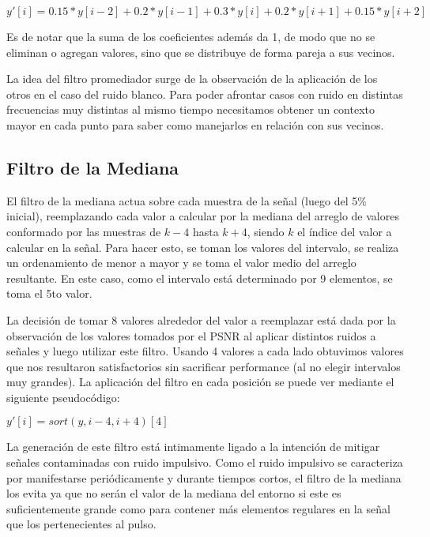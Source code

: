 \begin{center}
$y'[i]=0.15*y[i-2] + 0.2*y[i-1] + 0.3*y[i]+0.2*y[i+1]+0.15*y[i+2]$\\
\end{center}

Es de notar que la suma de los coeficientes adem\'as da 1, de modo que no se 
eliminan o agregan valores, sino que se distribuye de forma pareja a sus vecinos.

La idea del filtro promediador surge de la observaci\'on de la aplicaci\'on de
los otros en el caso del ruido blanco. Para poder afrontar casos con ruido en
distintas frecuencias muy distintas al mismo tiempo necesitamos obtener un
contexto mayor en cada punto para saber como manejarlos en relaci\'on con sus
vecinos.

\subsection{Filtro de la Mediana}

El filtro de la mediana actua sobre cada muestra de la se\~nal (luego del 5\% inicial),
reemplazando cada valor a calcular por la mediana del arreglo de valores conformado por
las muestras de $k - 4$ hasta $k + 4$, siendo $k$ el \'indice del valor a calcular en la 
se\~nal. Para hacer esto, se toman los valores del intervalo, se realiza un ordenamiento
de menor a mayor y se toma el valor medio del arreglo resultante. 
En este caso, como el intervalo est\'a determinado por 9 elementos, se toma el 5to valor.

La decisi\'on de tomar 8 valores alrededor del valor a reemplazar est\'a dada por la observaci\'on
de los valores tomados por el PSNR al aplicar distintos ruidos a se\~nales y luego utilizar este 
filtro. Usando 4 valores a cada lado obtuvimos valores que nos resultaron satisfactorios sin 
sacrificar performance (al no elegir intervalos muy grandes). La aplicaci\'on del filtro en cada
posici\'on se puede ver mediante el siguiente pseudoc\'odigo:

\begin{center}
$y'[i]= sort(y, i - 4, i + 4)[4]$\\
\end{center}

La generaci\'on de este filtro est\'a intimamente ligado a la intenci\'on de mitigar se\~nales contaminadas
con ruido impulsivo. Como el ruido impulsivo se caracteriza por manifestarse peri\'odicamente y durante tiempos
cortos, el filtro de la mediana los evita ya que no ser\'an el valor de la mediana del entorno si este es suficientemente
grande como para contener m\'as elementos regulares en la se\~nal que los pertenecientes al pulso.

